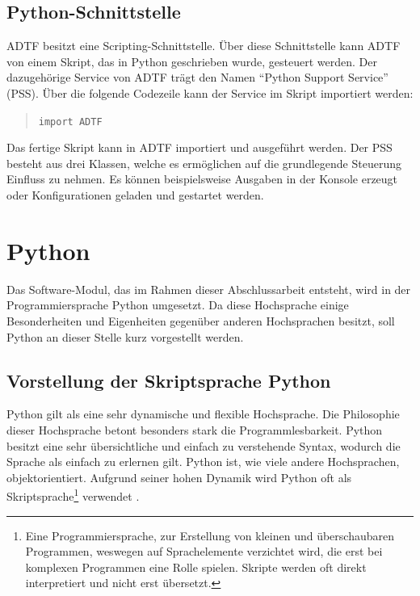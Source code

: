 \documentclass[12pt,a4paper]{report}
\begin{document}
\subsection{Python-Schnittstelle}\label{subsec:Pythonschnittstelle}
ADTF besitzt eine Scripting-Schnittstelle. Über diese Schnittstelle kann ADTF von einem Skript, das in Python geschrieben wurde, gesteuert werden. Der dazugehörige Service von ADTF trägt den Namen "`Python Support Service"' (PSS). Über die folgende Codezeile kann der Service im Skript importiert werden:
\begin{quote}
\verb|import ADTF|
\end{quote}
Das fertige Skript kann in ADTF importiert und ausgeführt werden. Der PSS besteht aus drei Klassen, welche es ermöglichen auf die grundlegende Steuerung Einfluss zu nehmen. Es können beispielsweise Ausgaben in der Konsole erzeugt oder Konfigurationen geladen und gestartet werden.
\section{Python}\label{sec:Python}
Das Software-Modul, das im Rahmen dieser Abschlussarbeit entsteht, wird in der Programmiersprache Python umgesetzt. Da diese Hochsprache einige Besonderheiten und Eigenheiten gegenüber anderen Hochsprachen besitzt, soll Python an dieser Stelle kurz vorgestellt werden.
\subsection{Vorstellung der Skriptsprache Python}\label{subsec:Vorstellung der Skriptsprache Python}
Python gilt als eine sehr dynamische und flexible Hochsprache. Die Philosophie dieser Hochsprache betont besonders stark die Programmlesbarkeit. Python besitzt eine sehr übersichtliche und einfach zu verstehende Syntax, wodurch die Sprache als einfach zu erlernen gilt. Python ist, wie viele andere Hochsprachen, objektorientiert. Aufgrund seiner hohen Dynamik wird Python oft als Skriptsprache\footnote{Eine Programmiersprache, zur Erstellung von kleinen und überschaubaren Programmen, weswegen auf Sprachelemente verzichtet wird, die erst bei komplexen Programmen eine Rolle spielen. Skripte werden oft direkt interpretiert und nicht erst übersetzt.} verwendet \cite{PythonOrgExecutiveSummary}.
\end{document}
